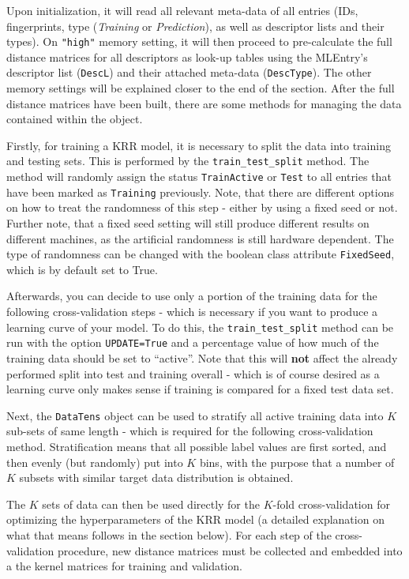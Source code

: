 \documentclass[12pt]{achemso}
\begin{document}
\noindent Upon initialization, it will read all relevant meta-data of all entries (IDs, fingerprints, type (\textit{Training} or \textit{Prediction}), as well as descriptor lists and their types). On \texttt{"high"} memory setting, it will then proceed to pre-calculate the full distance matrices for all descriptors as look-up tables using the MLEntry's descriptor list (\verb+DescL+) and their attached meta-data (\verb+DescType+). The other memory settings will be explained closer to the end of the section. After the full distance matrices have been built, there are some methods for managing the data contained within the object.  

\noindent Firstly, for training a KRR model, it is necessary to split the data into training and testing sets. This is performed by the \texttt{train\_test\_split} method. The method will randomly assign the status \texttt{TrainActive} or \texttt{Test} to all entries that have been marked as \texttt{Training} previously. Note, that there are different options on how to treat the randomness of this step - either by using a fixed seed or not. Further note, that a fixed seed setting will still produce different results on different machines, as the artificial randomness is still hardware dependent. The type of randomness can be changed with the boolean class attribute \texttt{FixedSeed}, which is by default set to True.

\noindent Afterwards, you can decide to use only a portion of the training data for the following cross-validation steps - which is necessary if you want to produce a learning curve of your model. To do this, the \texttt{train\_test\_split} method can be run with the option \texttt{UPDATE=True} and a percentage value of how much of the training data should be set to ``active''. Note that this will \textbf{not} affect the already performed split into test and training overall - which is of course desired as a learning curve only makes sense if training is compared for a fixed test data set.

\noindent Next, the \texttt{DataTens} object can be used to stratify all active training data into $K$ sub-sets of same length - which is required for the following cross-validation method. Stratification means that all possible label values are first sorted, and then evenly (but randomly) put into $K$ bins, with the purpose that a number of $K$ subsets with similar target data distribution is obtained.

\noindent The $K$ sets of data can then be used directly for the $K$-fold cross-validation for optimizing the hyperparameters of the KRR model (a detailed explanation on what that means follows in the section below). For each step of the cross-validation procedure, new distance matrices must be collected and embedded into a the kernel matrices for training and validation.
\end{document}
